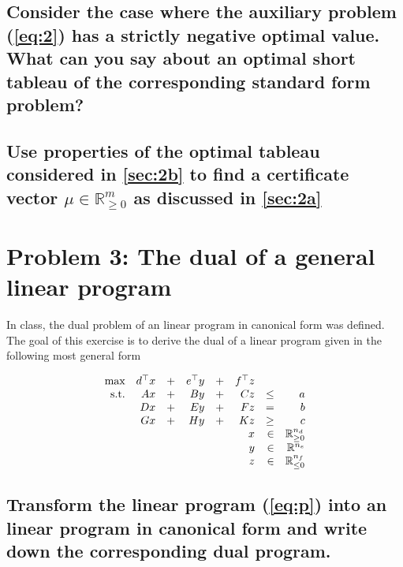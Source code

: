 \documentclass[12pt, a4]{article}
\begin{document}
{\subsection{Consider the case where the auxiliary problem (\ref{eq:2}) has a strictly negative optimal value. What can you say about an optimal short tableau of the corresponding standard form problem?}{\label{sec:2b}}

\subsection{Use properties of the optimal tableau considered in \ref{sec:2b} to find a certificate vector $\mu \in \mathbb{R}^m_{\geq0}$ as discussed in \ref{sec:2a}}

\pagebreak
\section{Problem 3: The dual of a general linear program}
In class, the dual problem of an linear program in canonical form was defined. The goal of this exercise is to derive the dual of a linear program given in the following most general form

\begin{equation}{\label{eq:p}}
	\begin{matrix*}[r]
		\text{max} & d^\top x & + & e^\top y & + & f^\top z \\
		\text{s.t.} & Ax & + & By & + & Cz & \leq & a \\	
		            & Dx & + & Ey & + & Fz & = & b \\	
		            & Gx & + & Hy & + & Kz & \geq & c		      \\	      
		            &    &   &    &   & x  & \in & \mathbb{R}^{n_d}_{\geq 0} \\
		            &    &   &    &   & y  & \in & \mathbb{R}^{n_e}\\
		            &    &   &    &   & z  & \in & \mathbb{R}^{n_f}_{\leq 0}\\		            		            
	\end{matrix*}
\end{equation}

\subsection{Transform the linear program (\ref{eq:p}) into an linear program in canonical form and write down the corresponding dual program.}{\label{sec:3a}}

}
\end{document}
